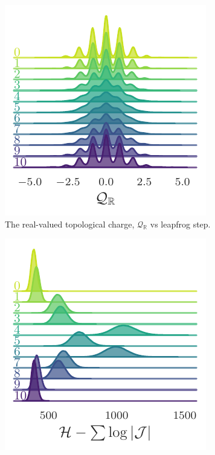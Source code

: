 \documentclass{article} %
\begin{document}
\begin{figure}[htpb]
\begin{subfigure}{0.31\textwidth}
      \includegraphics[width=\textwidth]{figures/2021-03-09/sinQf_1755.pdf}
      \caption{\label{fig:sinQf}The real-valued topological charge, \(\mathcal{Q}_{\mathbb{R}}\) vs leapfrog step.}%
   \end{subfigure}
   \hfill
   \begin{subfigure}{0.31\textwidth}
      \includegraphics[width=\textwidth]{figures/2021-03-09/hwf_1756.pdf}

\end{subfigure}
\end{figure}
\end{document}
